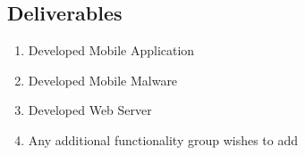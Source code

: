 \subsection{Deliverables}
\small
\begin{enumerate}
\item Developed Mobile Application
\item Developed Mobile Malware
\item Developed Web Server
\item Any additional functionality group wishes to add
\end{enumerate}
